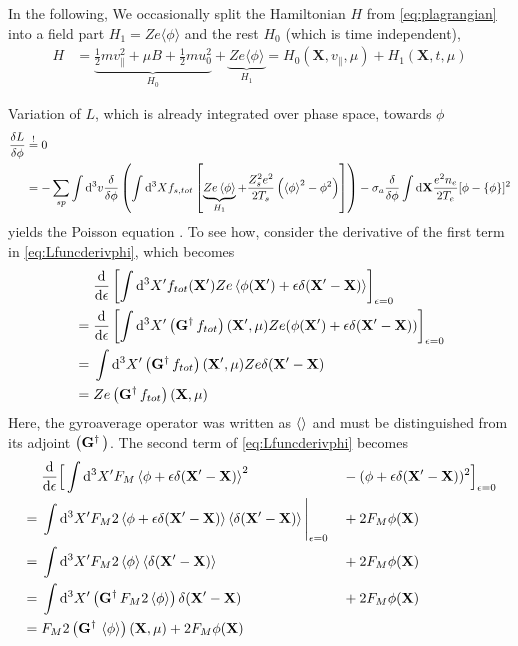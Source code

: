 In the following, We occasionally split the Hamiltonian $H$ from \eqref{eq:plagrangian} into a field part $H_1 = Z e \langle \phi \rangle$ and the rest $H_0$ (which is time independent),
\begin{align}
  H &= \underbrace{\frac{1 }{ 2} m v_\parallel^2 + \mu B +  \frac{1 }{ 2} m u_0^2}_{H_0} +\underbrace{Z e \langle \phi \rangle}_{H_1} = H_0(\mathbf{X}, v_\parallel, \mu) + H_1(\mathbf{X}, t, \mu) 
\label{eq:Hsplit}
\end{align}

Variation of $L$, which is already integrated over phase space, towards $\phi$
\begin{align}
  \frac{\delta L}{\delta \phi} &\overset{!}{=} 0  \\
   &= - \sum_{sp}\int\mathrm{d}^3v 
\frac{\delta}{\delta\phi}
\left(\int\mathrm{d}^3X f_{s,tot}
    \left[\underbrace{Ze\left\langle \phi\right\rangle}_{H_1} + \frac{Z_s^2e^2}{2T_s}\left(\left\langle \phi\right\rangle^2 - \phi^2\right)\right]
 \right)
 - \sigma_a\frac{\delta}{\delta\phi} \int \mathrm{d}\mathbf{X} \frac{e^2 n_e }{ 2 T_e} [ \phi - \{ \phi \} ]^2
\label{eq:Lfuncderivphi}
\end{align}
yields the Poisson equation .
\ifmoredetails
To see how, consider the derivative of the first term in \eqref{eq:Lfuncderivphi}, which becomes
\begin{align}
  &\frac{\mathrm{d} }{\mathrm{d} \epsilon}\left[\int\mathrm{d}^3X^\prime f_{tot}(\mathbf{X}^\prime) Ze\left\langle \phi(\mathbf{X}^\prime) + \epsilon\delta(\mathbf{X}^\prime - \mathbf{X})\right\rangle\right]_{\epsilon=0}  \nonumber\\
{}={}&\frac{\mathrm{d} }{\mathrm{d} \epsilon}\left[\int\mathrm{d}^3X^\prime \left(\mathbf{G}^\dagger\,  f_{tot}\right)(\mathbf{X}^\prime,\mu) Ze(\phi(\mathbf{X}^\prime) + \epsilon\delta(\mathbf{X}^\prime - \mathbf{X}))\right]_{\epsilon=0}  \nonumber\\
{}={}& \int\mathrm{d}^3X^\prime \left(\mathbf{G}^\dagger\, f_{tot}\right)(\mathbf{X}^\prime,\mu) Ze \delta(\mathbf{X}^\prime - \mathbf{X}) \nonumber\\
{}={}& Ze \left(\mathbf{G}^\dagger\,  f_{tot}\right)(\mathbf{X},\mu) 
\label{eq:Lfuncderivphi1stterm}
\end{align}
Here, the gyroaverage operator was written as $\left\langle \right\rangle$ and must be distinguished from its adjoint $\left(\mathbf{G}^\dagger\, \right)$.
The second term of \eqref{eq:Lfuncderivphi} becomes
  \begin{align}
   &\frac{\mathrm{d} }{\mathrm{d} \epsilon}\Big[\int\mathrm{d}^3X^\prime F_M\left\langle \phi + \epsilon\delta(\mathbf{X}^\prime - \mathbf{X})\right\rangle^2 &&- (\phi + \epsilon\delta(\mathbf{X}' - \mathbf{X}))^2\Big]_{\epsilon=0} \nonumber\\
   {}={}& \int\mathrm{d}^3X^\prime F_M 2\left\langle \phi + \epsilon\delta(\mathbf{X}^\prime - \mathbf{X})\right\rangle\left\langle \delta(\mathbf{X}^\prime - \mathbf{X})\right\rangle\Bigg|_{\epsilon=0} &&+ 2F_M\phi(\mathbf{X})\nonumber\\
   {}={}& \int\mathrm{d}^3X^\prime F_M 2\left\langle \phi\right\rangle\left\langle \delta(\mathbf{X}^\prime - \mathbf{X})\right\rangle&&+ 2F_M\phi(\mathbf{X})\nonumber\\
   {}={}& \int\mathrm{d}^3X^\prime \left(\mathbf{G}^\dagger\, F_M 2\left\langle \phi\right\rangle\right)\delta(\mathbf{X}^\prime - \mathbf{X})&&+ 2F_M\phi(\mathbf{X})\nonumber\\
   {}={}&  F_M 2\left(\mathbf{G}^\dagger\, \left\langle \phi\right\rangle\right)(\mathbf{X},\mu)+ 2F_M\phi(\mathbf{X}) \label{eq:Lfuncderivphi2ndterm}
   \end{align}
